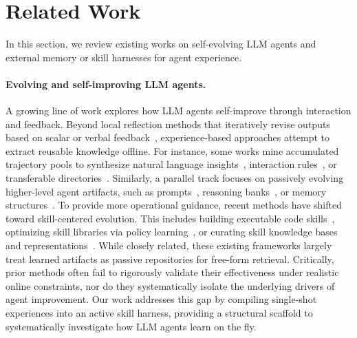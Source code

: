 


\section{Related Work}\label{sec:related}
In this section, we review existing works on self-evolving LLM agents and external memory or skill harnesses for agent experience.

\paragraph{Evolving and self-improving LLM agents.}
A growing line of work explores how LLM agents self-improve through interaction and feedback. Beyond local reflection methods that iteratively revise outputs based on scalar or verbal feedback~\cite{shinn2023reflexion,madaan2023self}, experience-based approaches attempt to extract reusable knowledge offline. For instance, some works mine accumulated trajectory pools to synthesize natural language insights~\cite{zhao2024expel}, interaction rules~\cite{chen2024automanual}, or transferable directories~\cite{ni2026trace2skill}. Similarly, a parallel track focuses on passively evolving higher-level agent artifacts, such as prompts~\cite{suzgun2025dynamic,lou2026autoharness}, reasoning banks~\cite{ouyang2025reasoningbank}, or memory structures~\cite{agrawal2025gepa,lee2026meta,zhang2025agentic,wei2025evo,lin2026position}. To provide more operational guidance, recent methods have shifted toward skill-centered evolution. This includes building executable code skills~\cite{wang2023voyager}, optimizing skill libraries via policy learning~\cite{xia2026skillrl,zhang2026memskill,ouyang2026skillos}, or curating skill knowledge bases and representations~\cite{yang2026autoskill,qiu2026autorefine,jiang2026xskill,wang2026skillx}. While closely related, these existing frameworks largely treat learned artifacts as passive repositories for free-form retrieval. Critically, prior methods often fail to rigorously validate their effectiveness under realistic online constraints, nor do they systematically isolate the underlying drivers of agent improvement. Our work addresses this gap by compiling single-shot experiences into an active skill harness, providing a structural scaffold to systematically investigate how LLM agents learn on the fly.



